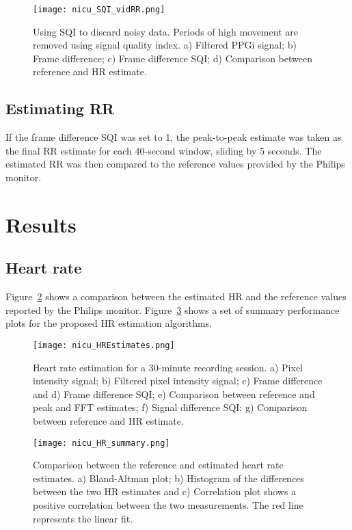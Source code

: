 \begin{figure}[!ht]
    \centering
\texttt{[image: nicu\_SQI\_vidRR.png]}
    \caption[Using SQI to discard noisy data. Periods of high movement are removed using signal quality index.]{Using SQI to discard noisy data. Periods of high movement are removed using signal quality index. a) Filtered PPGi signal; b) Frame difference; c) Frame difference SQI; d) Comparison between reference and HR estimate.}
    \label{SQI_vidRR}
\end{figure}

 \subsection{Estimating RR}
 
If the frame difference SQI was set to 1, the peak-to-peak estimate was taken as the final RR estimate for each 40-second window, sliding by 5 seconds. The estimated RR was then compared to the reference values provided by the Philips monitor.

\section{Results}
 \subsection{Heart rate}
 
Figure~\ref{HRresults} shows a comparison between the estimated HR and the reference values reported by the Philips monitor. Figure~\ref{HRsummary} shows a set of summary performance plots for the proposed HR estimation algorithms.
 
\begin{figure}[!ht]
\centering
\texttt{[image: nicu\_HREstimates.png]}
    \caption[Heart rate estimation for a 30-minute recording session.] {Heart rate estimation for a 30-minute recording session. a) Pixel intensity signal; b) Filtered pixel intensity signal; c) Frame difference and d) Frame difference SQI; e) Comparison between reference and peak and FFT estimates; f) Signal difference SQI; g) Comparison between reference and HR estimate.}
     \label{HRresults}
    \end{figure}
 
\begin{figure}[!ht]
    \centering
\texttt{[image: nicu\_HR\_summary.png]}
 \caption[Comparison between the reference and estimated heart rate estimates.]{Comparison between the reference and estimated heart rate estimates. a) Bland-Altman plot; b) Histogram of the differences between the two HR estimates and c) Correlation plot shows a positive correlation between the two measurements. The red line represents the linear fit.}
\label{HRsummary}
\end{figure}
 
